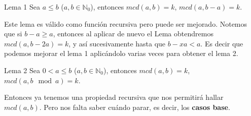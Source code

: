 \documentclass[compress]{beamer}
\begin{document}
\begin{frame}

\begin{block}{Lema 1}
	Sea $a \leq b$ ($a, b \in \mathbb{N}_0$), entonces $mcd(a, b) = k$, $mcd(a, b-a) = k$.
\end{block}

Este lema es v\'alido como funci\'on recursiva pero puede ser mejorado. Notemos que si $b-a \geq a$, entonces al aplicar de nuevo el Lema obtendremos
$mcd(a,b-2a) = k$, y as\'i sucesivamente hasta que $b-xa < a$. Es decir que podemos mejorar el lema 1 aplic\'andolo varias veces para obtener el lema 2.\\ \bigskip

\pause
{}
\end{frame}

\begin{frame}
\begin{block}{Lema 2}
	Sea $0 < a \leq b$ ($a, b \in \mathbb{N}_0$), entonces $mcd(a, b) = k$, $mcd(a, b \mod{a}) = k$.
\end{block}
\pause
{}
\end{frame}

\begin{frame}
Entonces ya tenemos una propiedad recursiva que nos permitir\'a hallar $mcd(a,b)$. Pero nos falta saber cu\'ando parar, es decir, los \textbf{casos base}. \\ \bigskip
\pause
{}
\end{frame}
\end{document}
